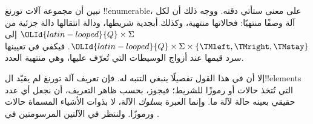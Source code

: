 \documentclass[../../../include/open-logic-section]{subfiles}
\begin{document}

\begin{explain}
نبين أن مجموعة آلات تورنغ !!{enumerable}، على معنى ستأتي دقته.
ووجه ذلك أن لكل آلة وصفًا منتهيًا: فحالاتها منتهية، وكذلك أبجدية
شريطها، ودالة انتقالها دالة جزئية من $\OLId{latin-looped}{Q} \times \Sigma$ إلى
$\OLId{latin-looped}{Q} \times \Sigma \times \{\TMleft,\TMright,\TMstay\}$. فيكفي في تعيينها
سرد قيمها عند أزواج الوسيطات التي تُعرّف عليها، وهي منتهية العدد.

إلا أن في هذا القول تفصيلًا ينبغي التنبه له. فإن تعريف آلة تورنغ
لم يقيّد ال!!{element}s التي تُتخذ حالات أو رموزًا للشريط؛ فيجوز،
بحسب ظاهر التعريف، أن نجعل أي عدد حقيقي بعينه حالة لآلة ما. وإنما
العبرة ب\emph{سلوك} الآلة، لا بذوات الأشياء المسماة حالات ورموزًا.
ولننظر في الآلتين المرسومتين في .
\begin{figure}
\begin{center}
\\
\end{center}
\end{figure}
\end{explain}
\end{document}
